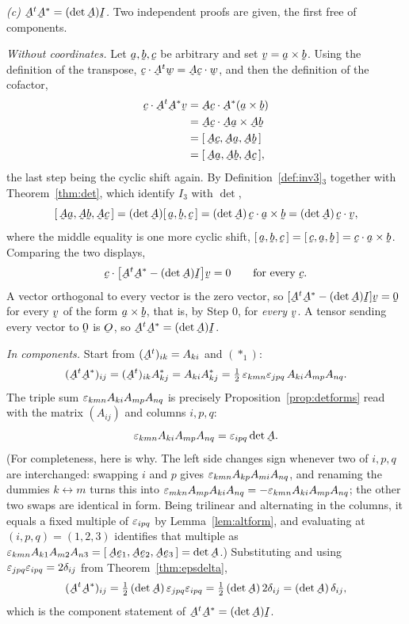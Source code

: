 \begin{solution}
\medskip
\emph{(c) $\bA^{t}\bA^{*}=(\det\bA)\I$.}
Two independent proofs are given, the first free of components.

\emph{Without coordinates.} Let $\ba,\bb,\bc$ be arbitrary and set
$\bv=\ba\times\bb$. Using the definition of the transpose,
$\ip{\bc}{\bA^{t}\bw}=\ip{\bA\bc}{\bw}$, and then the definition of the
cofactor,
\[
\begin{aligned}
   \ip{\bc}{\bA^{t}\bA^{*}\bv}
   &=\ip{\bA\bc}{\bA^{*}(\ba\times\bb)}\\
   &=\ip{\bA\bc}{\bA\ba\times\bA\bb}\\
   &=\tbox{\bA\bc}{\bA\ba}{\bA\bb}\\
   &=\tbox{\bA\ba}{\bA\bb}{\bA\bc},
\end{aligned}
\]
the last step being the cyclic shift again. By
Definition~\ref{def:inv3}$_{3}$ together with Theorem~\ref{thm:det}, which
identify $I_{3}$ with $\det$,
\[
   \tbox{\bA\ba}{\bA\bb}{\bA\bc}=(\det\bA)\tbox\ba\bb\bc
   =(\det\bA)\,\ip{\bc}{\ba\times\bb}=(\det\bA)\,\ip\bc\bv ,
\]
where the middle equality is one more cyclic shift,
$\tbox\ba\bb\bc=\tbox\bc\ba\bb=\ip{\bc}{\ba\times\bb}$. Comparing the two
displays,
\[
   \ip{\bc}{\big[\bA^{t}\bA^{*}-(\det\bA)\I\big]\bv}=0
   \qquad\text{for every }\bc .
\]
A vector orthogonal to every vector is the zero vector, so
$[\bA^{t}\bA^{*}-(\det\bA)\I]\bv=\bze$ for every $\bv$ of the form
$\ba\times\bb$, that is, by Step 0, for \emph{every} $\bv$. A tensor
sending every vector to $\bze$ is $\Ob$, so $\bA^{t}\bA^{*}=(\det\bA)\I$.

\emph{In components.} Start from $(\bA^{t})_{ik}=A_{ki}$ and $(\ast_1)$:
\[
   (\bA^{t}\bA^{*})_{ij}=(\bA^{t})_{ik}A^{*}_{kj}=A_{ki}A^{*}_{kj}
   =\tfrac12\,\eps_{kmn}\eps_{jpq}\,A_{ki}A_{mp}A_{nq}.
\]
The triple sum $\varepsilon_{kmn}A_{ki}A_{mp}A_{nq}$ is precisely
Proposition~\ref{prop:detforms} read with the matrix $(A_{ij})$ and columns
$i,p,q$:
\[
   \eps_{kmn}A_{ki}A_{mp}A_{nq}=\eps_{ipq}\det\bA .
\]
(For completeness, here is why. The left side changes sign whenever two of
$i,p,q$ are interchanged: swapping $i$ and $p$ gives
$\varepsilon_{kmn}A_{kp}A_{mi}A_{nq}$, and renaming the dummies $k\leftrightarrow
m$ turns this into $\varepsilon_{mkn}A_{mp}A_{ki}A_{nq}
=-\varepsilon_{kmn}A_{ki}A_{mp}A_{nq}$; the other two swaps are identical in form.
Being trilinear and alternating in the columns, it equals a fixed multiple
of $\varepsilon_{ipq}$ by Lemma~\ref{lem:altform}, and evaluating at
$(i,p,q)=(1,2,3)$ identifies that multiple as
$\eps_{kmn}A_{k1}A_{m2}A_{n3}=\tbox{\bA\be_{1}}{\bA\be_{2}}{\bA\be_{3}}
=\det\bA$.)
Substituting and using $\varepsilon_{jpq}\varepsilon_{ipq}=2\delta_{ij}$ from
Theorem~\ref{thm:epsdelta},
\[
   (\bA^{t}\bA^{*})_{ij}=\tfrac12\,(\det\bA)\,\eps_{jpq}\eps_{ipq}
   =\tfrac12\,(\det\bA)\,2\dd_{ij}=(\det\bA)\,\dd_{ij},
\]
which is the component statement of $\bA^{t}\bA^{*}=(\det\bA)\I$.


\end{solution}
